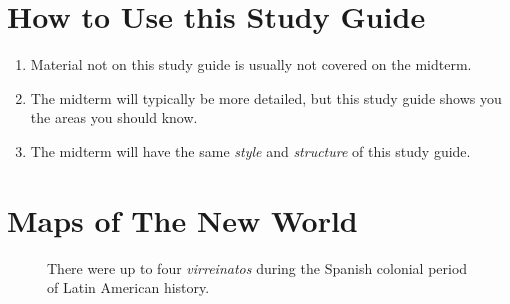 \documentclass[10pt]{article}
\begin{document}
\maketitle

\section{How to Use this Study Guide}

\begin{enumerate}
\item Material not on this study guide is usually not covered on the midterm.
\item The midterm will typically be more detailed, but this study guide shows you the areas you should know.
\item The midterm will have the same \textit{style} and \textit{structure} of this study guide.
\end{enumerate}

\section{Maps of The New World}

\begin{figure}[ht]
\centering
\caption{\label{fig:map1} There were up to four \textit{virreinatos} during the Spanish colonial period of Latin American history.}
\end{figure}
\end{document}
